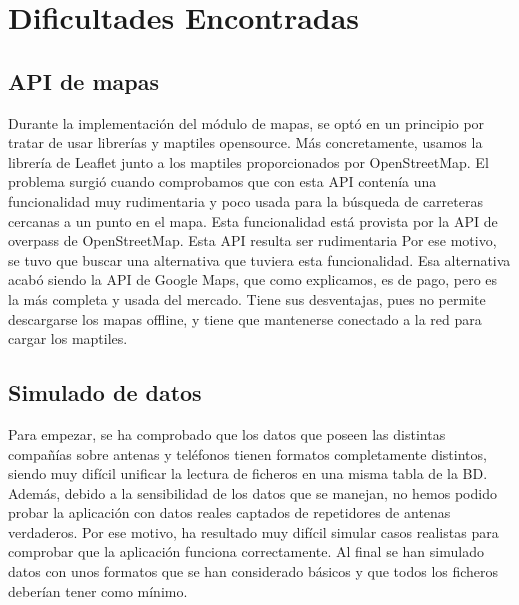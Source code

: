 \section{Dificultades Encontradas\label{SEC:DIFICULTAD}}
  \subsection{API de mapas}
    Durante la implementación del módulo de mapas, se optó en un principio por tratar de usar librerías y maptiles opensource. Más concretamente, usamos la librería de Leaflet junto a los maptiles proporcionados por OpenStreetMap.
    El problema surgió cuando comprobamos que con esta API contenía una funcionalidad muy rudimentaria y poco usada para la búsqueda de carreteras cercanas a un punto en el mapa. Esta funcionalidad está provista por la API de overpass de OpenStreetMap. Esta API resulta ser rudimentaria 
    Por ese motivo, se tuvo que buscar una alternativa que tuviera esta funcionalidad. Esa alternativa acabó siendo la API de Google Maps, que como explicamos, es de pago, pero es la más completa y usada del mercado.
    Tiene sus desventajas, pues no permite descargarse los mapas offline, y tiene que mantenerse conectado a la red para cargar los maptiles.
   \subsection{Simulado de datos}
    Para empezar, se ha comprobado que los datos que poseen las distintas compañías sobre antenas y teléfonos tienen formatos completamente distintos, siendo muy difícil unificar la lectura de ficheros en una misma tabla de la BD.
    Además, debido a la sensibilidad de los datos que se manejan, no hemos podido probar la aplicación con datos reales captados de repetidores de antenas verdaderos. Por ese motivo, ha resultado muy difícil simular casos realistas para comprobar que la aplicación funciona correctamente. Al final se han simulado datos con unos formatos que se han considerado básicos y que todos los ficheros deberían tener como mínimo.
    
   